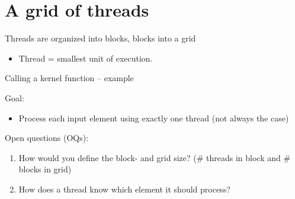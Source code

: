 \documentclass[11pt,t]{beamer}
\begin{document}
\section{A grid of threads}

\begin{frame}{Threads are organized into blocks, blocks into a grid} 
    \begin{small}
        \begin{itemize}
            \item Thread = smallest unit of execution.
        \end{itemize}   
    \end{small}
    \begin{figure}[t]
        \centering
        \begin{center}               
            \resizebox{0.9\columnwidth}{!}{}
        \end{center}
    \end{figure}
    
\end{frame}



\begin{frame}{Calling a kernel function -- example} 

    \vspace{0.5 em}
    Goal:
    \begin{small}
    \begin{itemize}
        \item Process each input element using exactly one thread {\footnotesize (not always the case)}
    \end{itemize}
    \end{small}
    
    \vspace{0.5 em}
    
    Open questions (OQs):
    \begin{small}
    \begin{enumerate}
        \item How would you define the block- and grid size? {\footnotesize (\# threads in block and \# blocks in grid)}
        \item How does a thread know which element it should process?
    \end{enumerate}
    \end{small}
    
    \vspace{0.5 em}
    
    \begin{figure}[t]
        \centering
        \begin{center}               
            \resizebox{0.8\columnwidth}{!}{}
        \end{center}
    \end{figure}

\end{frame}
\end{document}
